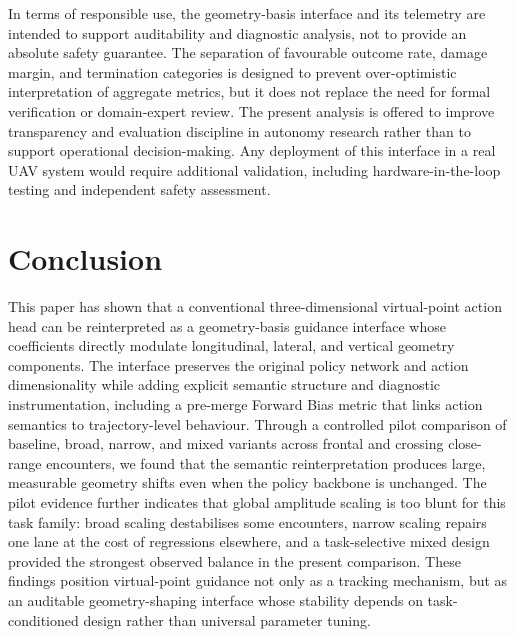 \documentclass[drones,article,submit,pdftex,moreauthors]{Definitions/mdpi}
\begin{document}
In terms of responsible use, the geometry-basis interface and its telemetry are intended to support auditability and diagnostic analysis, not to provide an absolute safety guarantee. The separation of favourable outcome rate, damage margin, and termination categories is designed to prevent over-optimistic interpretation of aggregate metrics, but it does not replace the need for formal verification or domain-expert review. The present analysis is offered to improve transparency and evaluation discipline in autonomy research rather than to support operational decision-making. Any deployment of this interface in a real UAV system would require additional validation, including hardware-in-the-loop testing and independent safety assessment.

\section{Conclusion}

This paper has shown that a conventional three-dimensional virtual-point action head can be reinterpreted as a geometry-basis guidance interface whose coefficients directly modulate longitudinal, lateral, and vertical geometry components. The interface preserves the original policy network and action dimensionality while adding explicit semantic structure and diagnostic instrumentation, including a pre-merge Forward Bias metric that links action semantics to trajectory-level behaviour. Through a controlled pilot comparison of baseline, broad, narrow, and mixed variants across frontal and crossing close-range encounters, we found that the semantic reinterpretation produces large, measurable geometry shifts even when the policy backbone is unchanged. The pilot evidence further indicates that global amplitude scaling is too blunt for this task family: broad scaling destabilises some encounters, narrow scaling repairs one lane at the cost of regressions elsewhere, and a task-selective mixed design provided the strongest observed balance in the present comparison. These findings position virtual-point guidance not only as a tracking mechanism, but as an auditable geometry-shaping interface whose stability depends on task-conditioned design rather than universal parameter tuning.



\end{document}
